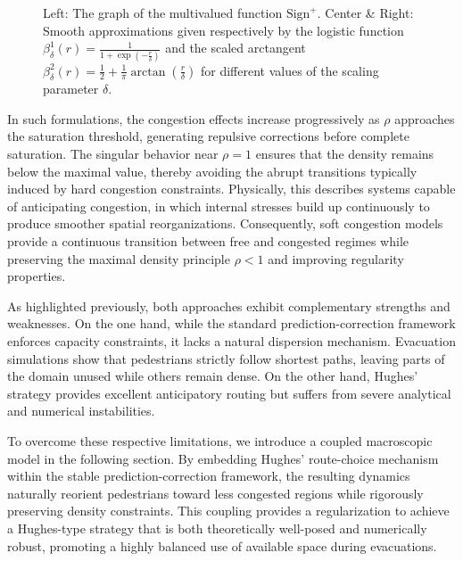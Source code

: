 \documentclass[final,reqno]{amsart}
\theoremstyle{plain}
\theoremstyle{definition}
\theoremstyle{remark}
\numberwithin{remark}{section}	%
\numberwithin{example}{section}	%
\begin{document}
\begin{figure}[htbp]
	
	\caption{Left: The graph of the multivalued function $\text{Sign}^+$. Center \& Right: Smooth approximations given respectively by the logistic function $\beta^{1}_{\delta}(r) = \frac{1}{1 + \exp\left(-\frac{r}{\delta}\right)}$ and the scaled arctangent $\beta^{2}_{\delta}(r) = \frac{1}{2} + \frac{1}{\pi} \arctan\left(\frac{r}{\delta}\right)$ for different values of the scaling parameter $\delta$.}
	\label{fig:smooth-approx}
\end{figure}
In such formulations, the congestion effects increase progressively as $\rho$ approaches the saturation threshold, generating repulsive corrections before complete saturation. The singular behavior near $\rho=1$ ensures that the density remains below the maximal value, thereby avoiding the abrupt transitions typically induced by hard congestion constraints. Physically, this describes systems capable of anticipating congestion, in which internal stresses build up continuously to produce smoother spatial reorganizations. Consequently, soft congestion models provide a continuous transition between free and congested regimes while preserving the maximal density principle $\rho<1$ and improving regularity properties.


As highlighted previously, both approaches exhibit complementary strengths and weaknesses. On the one hand, while the standard prediction-correction framework \cite{ennaji2023prediction} enforces capacity constraints, it lacks a natural dispersion mechanism. Evacuation simulations show that pedestrians strictly follow shortest paths, leaving parts of the domain unused while others remain dense. On the other hand, Hughes' strategy provides excellent anticipatory routing but suffers from severe analytical and numerical instabilities.

To overcome these respective limitations, we introduce a coupled macroscopic model in the following section. By embedding Hughes' route-choice mechanism within the stable prediction-correction framework, the resulting dynamics naturally reorient pedestrians toward less congested regions while rigorously preserving density constraints. This coupling provides a regularization to achieve a Hughes-type strategy that is both theoretically well-posed and numerically robust, promoting a highly balanced use of available space during evacuations.
\end{document}
